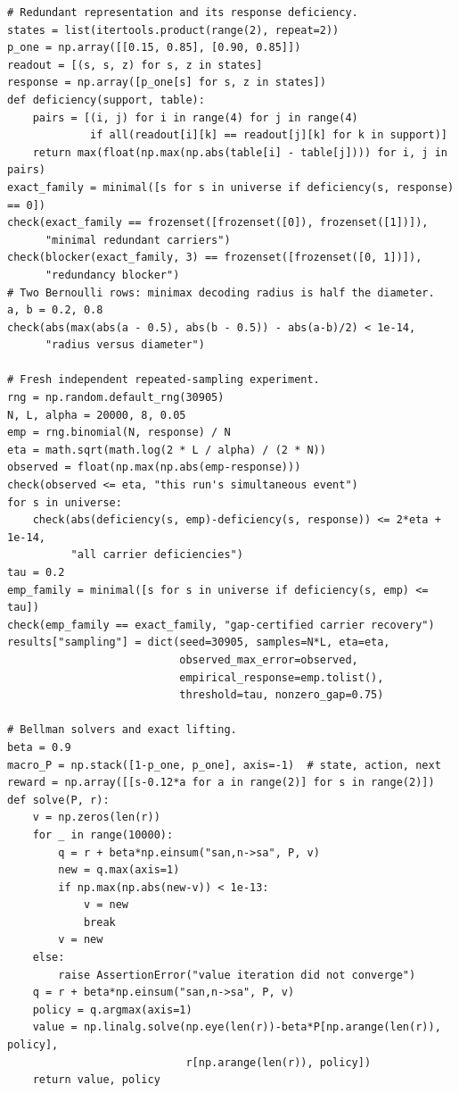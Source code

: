 \documentclass[
  english,
  11pt,
  oneside]{book}
\begin{document}
\begin{verbatim}
# Redundant representation and its response deficiency.
states = list(itertools.product(range(2), repeat=2))
p_one = np.array([[0.15, 0.85], [0.90, 0.85]])
readout = [(s, s, z) for s, z in states]
response = np.array([p_one[s] for s, z in states])
def deficiency(support, table):
    pairs = [(i, j) for i in range(4) for j in range(4)
             if all(readout[i][k] == readout[j][k] for k in support)]
    return max(float(np.max(np.abs(table[i] - table[j]))) for i, j in pairs)
exact_family = minimal([s for s in universe if deficiency(s, response) == 0])
check(exact_family == frozenset([frozenset([0]), frozenset([1])]),
      "minimal redundant carriers")
check(blocker(exact_family, 3) == frozenset([frozenset([0, 1])]),
      "redundancy blocker")
# Two Bernoulli rows: minimax decoding radius is half the diameter.
a, b = 0.2, 0.8
check(abs(max(abs(a - 0.5), abs(b - 0.5)) - abs(a-b)/2) < 1e-14,
      "radius versus diameter")

# Fresh independent repeated-sampling experiment.
rng = np.random.default_rng(30905)
N, L, alpha = 20000, 8, 0.05
emp = rng.binomial(N, response) / N
eta = math.sqrt(math.log(2 * L / alpha) / (2 * N))
observed = float(np.max(np.abs(emp-response)))
check(observed <= eta, "this run's simultaneous event")
for s in universe:
    check(abs(deficiency(s, emp)-deficiency(s, response)) <= 2*eta + 1e-14,
          "all carrier deficiencies")
tau = 0.2
emp_family = minimal([s for s in universe if deficiency(s, emp) <= tau])
check(emp_family == exact_family, "gap-certified carrier recovery")
results["sampling"] = dict(seed=30905, samples=N*L, eta=eta,
                           observed_max_error=observed,
                           empirical_response=emp.tolist(),
                           threshold=tau, nonzero_gap=0.75)

# Bellman solvers and exact lifting.
beta = 0.9
macro_P = np.stack([1-p_one, p_one], axis=-1)  # state, action, next
reward = np.array([[s-0.12*a for a in range(2)] for s in range(2)])
def solve(P, r):
    v = np.zeros(len(r))
    for _ in range(10000):
        q = r + beta*np.einsum("san,n->sa", P, v)
        new = q.max(axis=1)
        if np.max(np.abs(new-v)) < 1e-13:
            v = new
            break
        v = new
    else:
        raise AssertionError("value iteration did not converge")
    q = r + beta*np.einsum("san,n->sa", P, v)
    policy = q.argmax(axis=1)
    value = np.linalg.solve(np.eye(len(r))-beta*P[np.arange(len(r)), policy],
                            r[np.arange(len(r)), policy])
    return value, policy


\end{verbatim}
\end{document}
